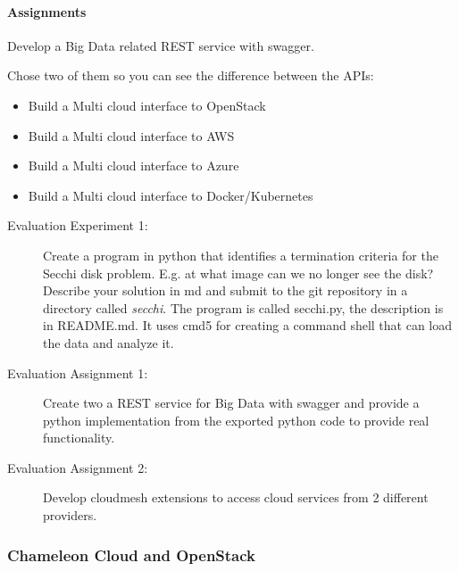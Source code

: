 

\paragraph{Assignments}

Develop a Big Data related REST service with swagger.

Chose two of them so you can see the difference between the APIs:

\begin{itemize}
\item Build a Multi cloud interface to OpenStack
\item Build a Multi cloud interface to AWS
\item Build a Multi cloud interface to Azure
\item Build a Multi cloud interface to Docker/Kubernetes
\end{itemize}


\begin{description}
\item[Evaluation Experiment 1:] Create a program in python that
  identifies a termination criteria for the Secchi disk
  problem. E.g. at what image can we no longer see the disk?
  Describe your solution in md and submit to the git repository in a
  directory called \textit{secchi}. The program is called secchi.py, the
  description is in README.md. It uses cmd5 for creating a command
  shell that can load the data and analyze it. 
\item[Evaluation Assignment 1:] Create two a REST service for Big Data
  with swagger and provide a python implementation from the exported
  python code to provide real functionality.
\item[Evaluation Assignment 2:] Develop cloudmesh extensions to access
  cloud services from 2 different providers.
\end{description}

\subsubsection{Chameleon Cloud and OpenStack}




